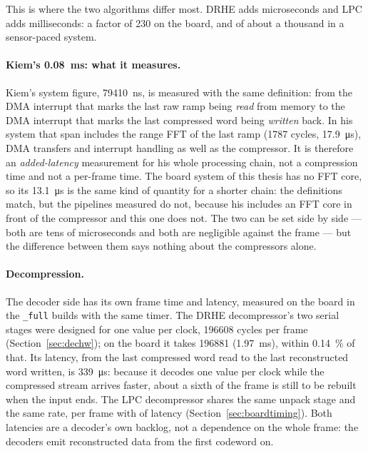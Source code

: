 \noindent
This is where the two algorithms differ most. DRHE adds microseconds and LPC
adds milliseconds: a factor of 230 on the board, and of about a thousand in a
sensor-paced system.

\paragraph{Kiem's \SI{0.08}{\milli\second}: what it measures.} Kiem's system
figure, \SI{79410}{\nano\second}, is measured with the same definition: from the
DMA interrupt that marks the last raw ramp being \emph{read} from memory to the
DMA interrupt that marks the last compressed word being \emph{written} back. In
his system that span includes the range FFT of the last ramp (\num{1787}
cycles, \SI{17.9}{\micro\second}), DMA transfers and interrupt handling as well
as the compressor. It is therefore an \emph{added-latency} measurement for his
whole processing chain, not a compression time and not a per-frame time. The
board system of this thesis has no FFT core, so its \SI{13.1}{\micro\second} is
the same kind of quantity for a shorter chain: the definitions match, but the
pipelines measured do not, because his includes an FFT core in front of the
compressor and this one does not. The two can be set side by side
--- both are tens of microseconds and both are negligible against the frame ---
but the difference between them says nothing about the compressors alone.

\paragraph{Decompression.} The decoder side has its own frame time and
latency, measured on the board in the \texttt{\_full} builds with the same
timer. The DRHE decompressor's two serial stages were designed for one value per
clock, \num{196608} cycles per frame (Section~\ref{sec:dechw}); on the board it
takes \num{196881} (\SI{1.97}{\milli\second}), within \SI{0.14}{\percent} of
that. Its latency, from the last compressed word read to the last reconstructed
word written, is \SI{339}{\micro\second}: because it decodes one value per clock
while the compressed stream arrives faster, about a sixth of the frame is still
to be rebuilt when the input ends. The LPC decompressor shares the same
unpack stage and the same rate, \lpcDecTime{} per frame with \lpcDecLat{} of
latency (Section~\ref{sec:boardtiming}). Both
latencies are a decoder's own backlog, not a dependence on the whole frame: the
decoders emit reconstructed data from the first codeword on.


